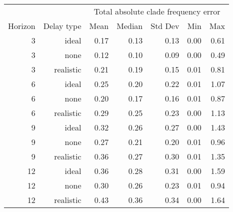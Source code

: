 
\begin{tabular*}{0.7\textwidth}{rrrrrrr}
\toprule
        &            & \multicolumn{5}{c}{Total absolute clade frequency error} \\
Horizon & Delay type & Mean & Median & Std Dev & Min & Max \\
\midrule

3 & ideal & 0.17 & 0.13 & 0.13 & 0.00 & 0.61 \\
3 & none & 0.12 & 0.10 & 0.09 & 0.00 & 0.49 \\
3 & realistic & 0.21 & 0.19 & 0.15 & 0.01 & 0.81 \\
6 & ideal & 0.25 & 0.20 & 0.22 & 0.01 & 1.07 \\
6 & none & 0.20 & 0.17 & 0.16 & 0.01 & 0.87 \\
6 & realistic & 0.29 & 0.25 & 0.23 & 0.00 & 1.13 \\
9 & ideal & 0.32 & 0.26 & 0.27 & 0.00 & 1.43 \\
9 & none & 0.27 & 0.21 & 0.20 & 0.01 & 0.96 \\
9 & realistic & 0.36 & 0.27 & 0.30 & 0.01 & 1.35 \\
12 & ideal & 0.36 & 0.28 & 0.31 & 0.00 & 1.59 \\
12 & none & 0.30 & 0.26 & 0.23 & 0.01 & 0.94 \\
12 & realistic & 0.43 & 0.36 & 0.34 & 0.00 & 1.64 \\

\bottomrule
\end{tabular*}

